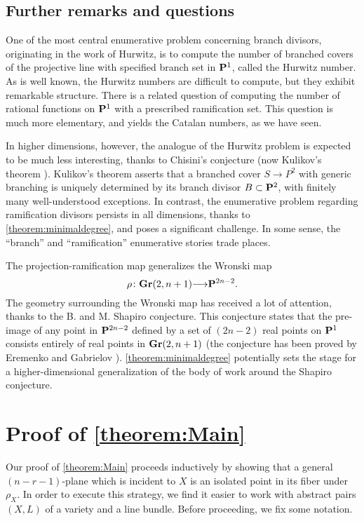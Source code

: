 \documentclass[11pt,reqno]{amsart}
\theoremstyle{plain}
\theoremstyle{definition}
\theoremstyle{remark}
\numberwithin{equation}{section}
\renewcommand{\to}{{\longrightarrow}}
\numberwithin{equation}{section}
\begin{document}
\subsection{Further remarks and questions}
One of the most central enumerative problem concerning branch divisors, originating in the work of Hurwitz, is to compute the number of branched covers of the projective line with specified branch set in $\P^1$, called the Hurwitz number.
As is well known, the Hurwitz numbers are difficult to compute, but they exhibit remarkable structure.
There is a related question of computing the number of rational functions on $\P^1$ with a prescribed ramification set.
This question is much more elementary, and yields the Catalan numbers, as we have seen.

In higher dimensions, however, the analogue of the Hurwitz problem is expected to be much less interesting, thanks to Chisini's conjecture (now Kulikov's theorem \cite{1064-5632-63-6-A03}).
Kulikov's theorem asserts that a branched cover $S \to P^2$ with generic branching is uniquely determined by its branch divisor $B \subset \P^{2}$, with finitely many well-understood exceptions.
In contrast, the enumerative problem regarding ramification divisors persists in all dimensions, thanks to \autoref{theorem:minimaldegree}, and poses a significant challenge.
In some sense, the ``branch'' and ``ramification'' enumerative stories trade places.

The projection-ramification map generalizes the Wronski map
\[ \rho \from \Gr(2, n+1) \to \P^{2n-2}.\]
The geometry surrounding the Wronski map has received a lot of attention, thanks to the B. and M. Shapiro conjecture.
This conjecture states that the pre-image of any point in $\P^{2n-2}$ defined by a set of $(2n-2)$ real points on $\P^1$ consists entirely of real points in $\Gr(2, n+1)$ \cite{sottile2000} (the conjecture has been proved by Eremenko and Gabrielov \cite{Erem/Gabr1}).
\autoref{theorem:minimaldegree} potentially sets the stage for a higher-dimensional generalization of the body of work around the Shapiro conjecture.


\section{Proof of \autoref{theorem:Main}}
\label{sec:proof_of_theorem:main}
Our proof of \autoref{theorem:Main} proceeds inductively by showing that a general
$(n-r-1)$-plane which is incident to $X$ is an isolated point in its fiber
under $\rho_{X}$.  In order to execute this strategy, we find it easier to work
with abstract pairs $(X,L)$ of a variety and a line bundle.  Before proceeding,
we fix some notation.
\end{document}
